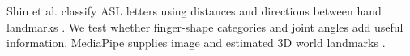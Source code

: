 Shin et al. classify ASL letters using distances and directions between hand landmarks \citep{ton-shin2021}. We test whether finger-shape categories and joint angles add useful information. MediaPipe supplies image and estimated 3D world landmarks \citep{ton-mediapipedocs}.
